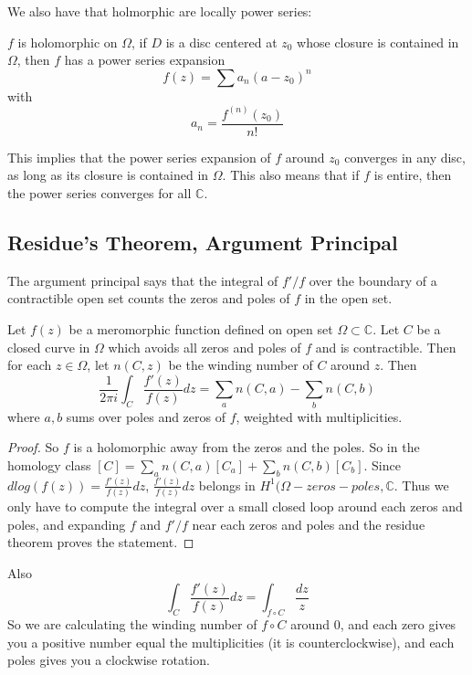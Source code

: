 \documentclass[main.tex]{subfiles}
\begin{document}
We also have that holmorphic are locally power series:

\begin{theorem}
$f$ is holomorphic on $\Omega$, if $D$ is a disc centered at $z_0$ whose closure is contained in $\Omega$, then $f$ has a power series expansion
$$
f(z) = \sum a_n (a - z_0)^n
$$
with 
$$
a_n = \frac{f^{(n)}(z_0)}{n!}
$$
\end{theorem}

This implies that the power series expansion of $f$ around $z_0$ converges in any disc, as long as its closure is contained in $\Omega$. This also means that if $f$ is entire, then the power series converges for all $\mathbb{C}$.


\subsection{Residue's Theorem, Argument Principal}

The argument principal says that the integral of $f'/f$ over the boundary of a contractible open set counts the zeros and poles of $f$ in the open set.

\begin{theorem}
Let $f(z)$ be a meromorphic function defined on open set $\Omega \subset \mathbb{C}$. Let $C$ be a closed curve in $\Omega$ which avoids all zeros and poles of $f$ and is contractible. Then for each $z \in \Omega$, let $n(C,z)$ be the winding number of $C$ around $z$. Then 
$$
\frac{1}{2\pi i} \int_C \frac{f'(z)}{f(z)} dz = \sum_a n(C,a) - \sum_b n(C,b)
$$
where $a, b$ sums over poles and zeros of $f$, weighted with multiplicities.
\end{theorem}

\begin{proof}
So $f$ is a holomorphic away from the zeros and the poles. So in the homology class $[C] = \sum_a n(C,a) [C_a] + \sum_b n(C, b) [C_b]$. Since $d log(f(z)) =\frac{f'(z)}{f(z)} dz$, $\frac{f'(z)}{f(z)} dz$ belongs in $H^1(\Omega - zeros - poles, \mathbb{C}$. Thus we only have to compute the integral over a small closed loop around each zeros and poles, and expanding $f$ and $f'/f$ near each zeros and poles and the residue theorem proves the statement.
\end{proof}

\begin{remark}
Also 
$$
\int_C \frac{f'(z)}{f(z)} dz = \int_{f \circ C} \frac{dz}{z}
$$
So we are calculating the winding number of $f \circ C$ around $0$, and each zero gives you a positive number equal the multiplicities (it is counterclockwise), and each poles gives you a clockwise rotation.
\end{remark}
\end{document}
